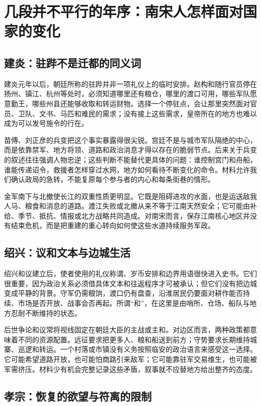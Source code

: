 \section{几段并不平行的年序：南宋人怎样面对国家的变化}

\subsection{建炎：驻跸不是迁都的同义词}

建炎元年以后，朝廷所称的驻跸并非一项礼仪上的临时安排。赵构和随行官员停在扬州、镇江、杭州等处时，必须知道哪里还有粮仓，哪里的渡口可用，哪些军队愿意勤王，哪些州县还能够收取和转运财物。选择一个停驻点，会让那里突然面对官员、卫队、文书、马匹和难民的需求；没有接上这些需求，皇帝所在的地方也难以成为可以发号施令的行在。

苗傅、刘正彦的兵变把这个事实暴露得很尖锐。宫廷不是与城市军队隔绝的中心，而是依靠禁军、地方将领、道路和政治消息才得以存在的脆弱节点。后来关于兵变的叙述往往强调人物忠逆；这些判断不能替代更具体的问题：谁控制宫门和舟船，谁能传递诏令，救援者怎样穿过水网，地方如何看待不断变化的命令。材料允许我们确认政局的急转，不能复原每个参与者的内心和每条街巷的情形。

金军南下与北撤使长江的双重性质更明显。它既是阻碍进攻的水面，也是运送敌我人马、粮食和消息的道路。渡江失败或北撤从来不等于江南天然安全；它可能由补给、季节、抵抗、情报或北方战略共同造成。对南宋而言，保存江南核心地区并没有结束危机，而是把重建的重心转向如何使这些水道持续服务军政。

\subsection{绍兴：议和文本与边城生活}

绍兴和议建立后，使者使用的礼仪称谓、岁币安排和边界用语很快进入史书。它们很重要，因为政治关系必须借具体文本和往返程序才可被承认；但它们没有把边城变成平静的背景。守军仍需粮饷，渡口仍有盘查，沿淮居民仍要面对耕作能否持续、市场是否开放、战事会否再起。所谓“和”，在这里是由哨所、仓场、船队与地方忍耐不断维持的状态。

后世争论和议常将视线固定在朝廷大臣的主战或主和。对边区而言，两种政策都意味着不同的资源配置。远征要求把更多人、粮和船送到前方；守势要求长期维持城寨、巡逻和转运。一个村落或市镇没有义务按照临安的政治语言来感受这一选择。它可能希望道路开放，也可能怕商路引来敌军；它可能靠驻军交易维生，也可能被军需挤压。材料少有机会完整记录这些矛盾，叙事就不应替地方给出整齐的态度。

\subsection{孝宗：恢复的欲望与符离的限制}

